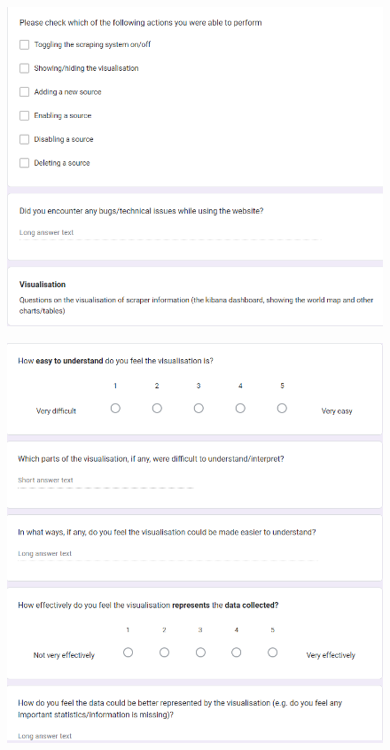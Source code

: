\documentclass{l4proj}
\begin{document}
\begin{appendices}
 \begin{figure}[h]
\centering
\includegraphics[width=\textwidth]{images/Form3.png}
\end{figure}

 \begin{figure}[h]
\centering
\includegraphics[width=\textwidth]{images/Form4.png}
\end{figure}


\end{appendices}
\end{document}
